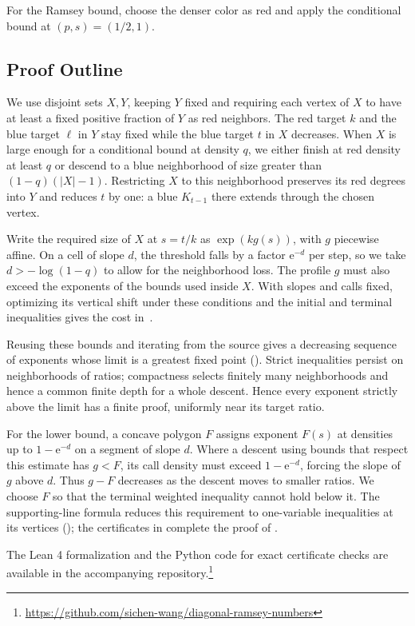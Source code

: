 \documentclass[11pt]{article}
\theoremstyle{definition}
\newcommand{\e}{\mathrm e}
\begin{document}
For the Ramsey bound, choose the denser color as red and apply the conditional bound at $(p,s)=(1/2,1)$.

\subsection{Proof Outline}
We use disjoint sets $X,Y$, keeping $Y$ fixed and requiring each vertex of $X$ to have at least a fixed positive fraction of $Y$ as red neighbors.
The red target $k$ and the blue target $\ell$ in $Y$ stay fixed while the blue target $t$ in $X$ decreases.
When $X$ is large enough for a conditional bound at density $q$, we either finish at red density at least $q$ or descend to a blue neighborhood of size greater than $(1-q)(|X|-1)$.
Restricting $X$ to this neighborhood preserves its red degrees into $Y$ and reduces $t$ by one: a blue $K_{t-1}$ there extends through the chosen vertex.

Write the required size of $X$ at $s=t/k$ as $\exp(kg(s))$, with $g$ piecewise affine.
On a cell of slope $d$, the threshold falls by a factor $\e^{-d}$ per step, so we take $d>-\log(1-q)$ to allow for the neighborhood loss.
The profile $g$ must also exceed the exponents of the bounds used inside $X$.
With slopes and calls fixed, optimizing its vertical shift under these conditions and the initial and terminal inequalities gives the cost in~.

Reusing these bounds and iterating from the source gives a decreasing sequence of exponents whose limit is a greatest fixed point ().
Strict inequalities persist on neighborhoods of ratios; compactness selects finitely many neighborhoods and hence a common finite depth for a whole descent.
Hence every exponent strictly above the limit has a finite proof, uniformly near its target ratio.

For the lower bound, a concave polygon $F$ assigns exponent $F(s)$ at densities up to $1-\e^{-d}$ on a segment of slope $d$.
Where a descent using bounds that respect this estimate has $g<F$, its call density must exceed $1-\e^{-d}$, forcing the slope of $g$ above $d$.
Thus $g-F$ decreases as the descent moves to smaller ratios.
We choose $F$ so that the terminal weighted inequality cannot hold below it.
The supporting-line formula reduces this requirement to one-variable inequalities at its vertices (); the certificates in  complete the proof of .

The Lean 4 formalization and the Python code for exact certificate checks are available in the accompanying repository.\footnote{\url{https://github.com/sichen-wang/diagonal-ramsey-numbers}}
\end{document}
